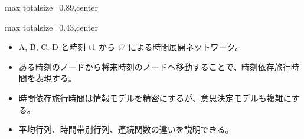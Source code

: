 \begin{minipage}[t]{0.58\textwidth}
\begin{adjustbox}{max totalsize={\textwidth}{0.89\textheight},center}
\begin{minipage}{\textwidth}
\end{minipage}
\end{adjustbox}
\end{minipage}


\clearpage
{}
\begin{minipage}[t]{0.405\textwidth}
\begin{adjustbox}{max totalsize={\textwidth}{0.43\textheight},center}
\begin{minipage}{\textwidth}\scriptsize
{}\begin{itemize}
\item A, B, C, D と時刻 t1 から t7 による時間展開ネットワーク。
\item ある時刻のノードから将来時刻のノードへ移動することで、時刻依存旅行時間を表現する。
\end{itemize}\begin{itemize}
\item 時間依存旅行時間は情報モデルを精密にするが、意思決定モデルも複雑にする。
\item 平均行列、時間帯別行列、連続関数の違いを説明できる。
\end{itemize}
\end{minipage}
\end{adjustbox}
\end{minipage}\hfill
